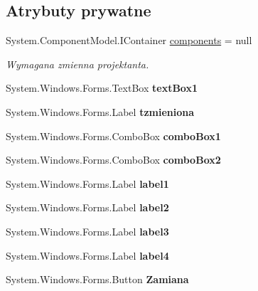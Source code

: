 \subsection*{Atrybuty prywatne}
\begin{DoxyCompactItemize}
\item 
System.\+Component\+Model.\+I\+Container \mbox{\hyperlink{classkalku__all__in__one_1_1_temperatura_ad71ec6a4400ab643b5367db27476886a}{components}} = null
\begin{DoxyCompactList}\small\item\em Wymagana zmienna projektanta. \end{DoxyCompactList}\item 
\mbox{\label{classkalku__all__in__one_1_1_temperatura_a25063212887a0c5b3cad54057fd3a2fc}} 
System.\+Windows.\+Forms.\+Text\+Box {\bfseries text\+Box1}
\item 
\mbox{\label{classkalku__all__in__one_1_1_temperatura_a67fca3a072de97cbe332238c14323f9b}} 
System.\+Windows.\+Forms.\+Label {\bfseries tzmieniona}
\item 
\mbox{\label{classkalku__all__in__one_1_1_temperatura_adcc99a320e489d9565eb66acff014d7a}} 
System.\+Windows.\+Forms.\+Combo\+Box {\bfseries combo\+Box1}
\item 
\mbox{\label{classkalku__all__in__one_1_1_temperatura_ad8720a370f541634f7a5fba74a09c49e}} 
System.\+Windows.\+Forms.\+Combo\+Box {\bfseries combo\+Box2}
\item 
\mbox{\label{classkalku__all__in__one_1_1_temperatura_a35e3f312b32432ad037c178e19cb3dbe}} 
System.\+Windows.\+Forms.\+Label {\bfseries label1}
\item 
\mbox{\label{classkalku__all__in__one_1_1_temperatura_a8c56103ea98657e5fabb6a58ad7ecc7b}} 
System.\+Windows.\+Forms.\+Label {\bfseries label2}
\item 
\mbox{\label{classkalku__all__in__one_1_1_temperatura_abd23ecfafad619dca9e0834c8f82299d}} 
System.\+Windows.\+Forms.\+Label {\bfseries label3}
\item 
\mbox{\label{classkalku__all__in__one_1_1_temperatura_a3d66306f62d5d27ffb4da638a5aa00db}} 
System.\+Windows.\+Forms.\+Label {\bfseries label4}
\item 
\mbox{\label{classkalku__all__in__one_1_1_temperatura_aba617d1eead442d8fdf97dff39ffc937}} 
System.\+Windows.\+Forms.\+Button {\bfseries Zamiana}
\end{DoxyCompactItemize}


